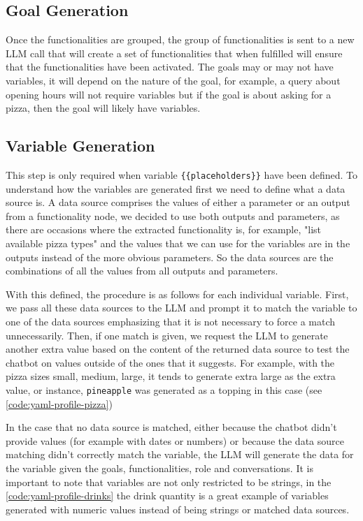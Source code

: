 \subsection{Goal Generation}

Once the functionalities are grouped,
the group of functionalities is sent to a new \ac{LLM} call
that will create a set of functionalities that when fulfilled
will ensure that the functionalities have been activated.
The goals may or may not have variables,
it will depend on the nature of the goal,
for example, a query about opening hours will not require variables
but if the goal is about asking for a pizza,
then the goal will likely have variables.

\subsection{Variable Generation}

This step is only required when variable \texttt{\{\{placeholders\}\}} have been defined.
To understand how the variables are generated
first we need to define what a data source is.
A data source comprises the values of either a parameter or an output from a functionality node,
we decided to use both outputs and parameters,
as there are occasions where the extracted functionality is,
for example, "list available pizza types"
and the values that we can use for the variables
are in the outputs instead of the more obvious parameters.
So the data sources are the combinations of all the values
from all outputs and parameters.

With this defined, the procedure is as follows for each individual variable.
First, we pass all these data sources to the \ac{LLM}
and prompt it to match the variable to one of the data sources
emphasizing that it is not necessary to force a match unnecessarily.
Then, if one match is given,
we request the \ac{LLM} to generate another extra value
based on the content of the returned data source
to test the chatbot on values outside of the ones that it suggests.
For example, with the pizza sizes small, medium, large,
it tends to generate extra large as the extra value,
or instance, \texttt{pineapple} was generated as a topping in this case
(see \autoref{code:yaml-profile-pizza})

In the case that no data source is matched,
either because the chatbot didn't provide values
(for example with dates or numbers)
or because the data source matching didn't correctly match the variable,
the \ac{LLM} will generate the data for the variable given
the goals, functionalities, role and conversations.
It is important to note that variables are not only restricted to be strings,
in the \autoref{code:yaml-profile-drinks} the drink quantity
is a great example of variables generated
with numeric values instead of being strings or matched data sources.

